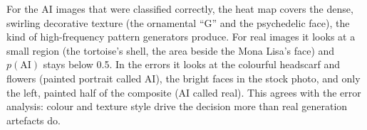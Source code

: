 For the AI images that were classified correctly, the heat map covers the dense, swirling
decorative texture (the ornamental ``G'' and the psychedelic face), the kind of high-frequency
pattern generators produce. For real images it looks at a small region (the tortoise's shell, the
area beside the Mona Lisa's face) and $p(\text{AI})$ stays below 0.5. In the errors it looks at
the colourful headscarf and flowers (painted portrait called AI), the bright faces in the stock
photo, and only the left, painted half of the composite (AI called real). This agrees with the
error analysis: colour and texture style drive the decision more than real generation artefacts
do.
